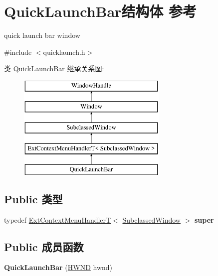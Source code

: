 \hypertarget{struct_quick_launch_bar}{}\section{Quick\+Launch\+Bar结构体 参考}
\label{struct_quick_launch_bar}


quick launch bar window  




{\ttfamily \#include $<$quicklaunch.\+h$>$}

类 Quick\+Launch\+Bar 继承关系图\+:\begin{figure}[H]
\begin{center}
\leavevmode
\includegraphics[height=5.000000cm]{struct_quick_launch_bar}
\end{center}
\end{figure}
\subsection*{Public 类型}
\begin{DoxyCompactItemize}
\item 
\mbox{\label{struct_quick_launch_bar_abe62e5e693463175497c2e37f83ea82d}} 
typedef \hyperlink{struct_ext_context_menu_handler_t}{Ext\+Context\+Menu\+HandlerT}$<$ \hyperlink{struct_subclassed_window}{Subclassed\+Window} $>$ {\bfseries super}
\end{DoxyCompactItemize}
\subsection*{Public 成员函数}
\begin{DoxyCompactItemize}
\item 
\mbox{\label{struct_quick_launch_bar_a2191696597c708f990519aa813a108d9}} 
{\bfseries Quick\+Launch\+Bar} (\hyperlink{interfacevoid}{H\+W\+ND} hwnd)
\end{DoxyCompactItemize}
